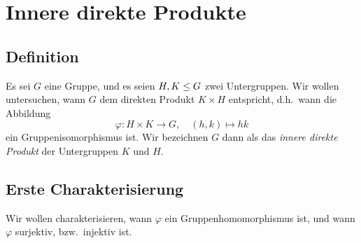 \section{Innere direkte Produkte}





\subsection*{Definition}

Es sei $G$ eine Gruppe, und es seien $H, K \leq G$ zwei Untergruppen.
Wir wollen untersuchen, wann $G$ dem direkten Produkt $K \times H$ entspricht, d.h.\ wann die Abbildung
\[
          \varphi
  \colon  H \times K
  \to     G,
  \quad   (h,k)
  \mapsto hk
\]
ein Gruppenisomorphismus ist.
Wir bezeichnen $G$ dann als das \emph{innere direkte Produkt} der Untergruppen $K$ und $H$.





\subsection*{Erste Charakterisierung}

Wir wollen charakterisieren, wann $\varphi$ ein Gruppenhomomorphismus ist, und wann $\varphi$ surjektiv, bzw.\ injektiv ist.

